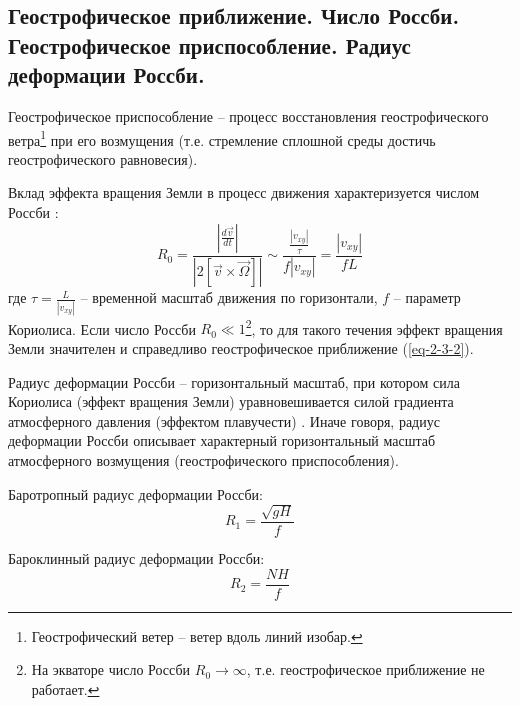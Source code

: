 \subsection{Геострофическое приближение. Число Россби. Геострофическое приспособление. Радиус деформации Россби. }
Геострофическое приспособление -- процесс восстановления геострофического ветра\footnote{Геострофический ветер -- ветер вдоль линий изобар.} при его возмущения (т.е. стремление сплошной среды достичь геострофического равновесия).

Вклад эффекта вращения Земли в процесс движения характеризуется числом Россби \cite{Nosov2019-6}:
\begin{equation}
R_0=\frac{\left|\frac{d\vec{v}}{dt}\right|}{\left|2\left[\vec{v}\times\vec{\Omega}\right]\right|}\sim\frac{\frac{|v_{xy}|}{\tau}}{f|v_{xy}|}=\frac{|v_{xy}|}{fL}
\end{equation}
где $\tau=\frac{L}{|v_{xy}|}$ -- временной масштаб движения по горизонтали, $f$ -- параметр Кориолиса.
Если число Россби $R_0\ll 1$\footnote{На экваторе число Россби $R_0\rightarrow\infty$, т.е. геострофическое приближение не работает.}, то для такого течения эффект вращения Земли значителен и справедливо геострофическое приближение (\ref{eq-2-3-2}).

Радиус деформации Россби -- горизонтальный масштаб, при котором сила Кориолиса (эффект вращения Земли) уравновешивается силой градиента атмосферного давления (эффектом плавучести) \cite{Белоненко-Новоселова-2019}.
Иначе говоря, радиус деформации Россби описывает характерный горизонтальный масштаб атмосферного возмущения (геострофического приспособления).

Баротропный радиус деформации Россби:
\begin{equation}
R_1=\frac{\sqrt{gH}}{f}
\end{equation}

Бароклинный радиус деформации Россби:
\begin{equation}
R_2=\frac{NH}{f}
\end{equation}
